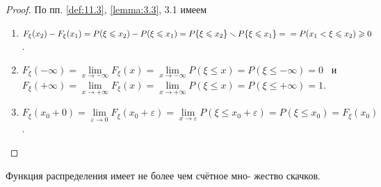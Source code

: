 \begin{proof}
	По пп. \ref{def:11.3}, \ref{lemma:3.3}, 3.1 имеем  
	\begin{enumerate}
		\item $F_{\xi}(x_2)-F_{\xi}(x_1)=P(\xi\leqslant x_2)-P(\xi\leqslant x_1)=
			P\{\xi\leqslant x_2\}\smallsetminus P\{\xi\leqslant x_1\}= \\
			=P(x_1<\xi\leqslant x_2)\geqslant 0$.
		
		\item $F_{\xi}(-\infty)=\lim\limits_{x\to-\infty}F_{\xi}(x)=\lim\limits_{x\to-\infty}P(\xi\leqslant x)=P(\xi\leqslant-\infty)=0$ \, и \,
		$F_{\xi}(+\infty)=\lim\limits_{x\to+\infty}F_{\xi}(x)=\lim\limits_{x\to+\infty}P(\xi\leqslant x)=P(\xi\leqslant+\infty)=1$.
		
		\item $F_{\xi}(x_0+0)=\lim\limits_{\varepsilon\to 0}F_{\xi}(x_0+\varepsilon)=\lim\limits_{x\to\varepsilon}P(\xi\leqslant x_0+\varepsilon)=P(\xi\leqslant x_0)=F_{\xi}(x_0)$.
		
	\end{enumerate}

\end{proof}

\begin{theorem}
	Функция распределения имеет не более чем счётное мно-
жество скачков.
\end{theorem}

